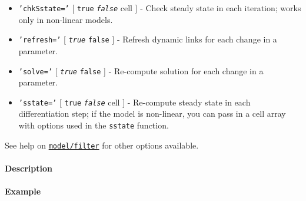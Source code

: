 \begin{itemize}
\item
  \texttt{'chkSstate='} {[} \texttt{true} \textbar{}
  \emph{\texttt{false}} \textbar{} cell {]} - Check steady state in each
  iteration; works only in non-linear models.
\item
  \texttt{'refresh='} {[} \emph{\texttt{true}} \textbar{} \texttt{false}
  {]} - Refresh dynamic links for each change in a parameter.
\item
  \texttt{'solve='} {[} \emph{\texttt{true}} \textbar{} \texttt{false}
  {]} - Re-compute solution for each change in a parameter.
\item
  \texttt{'sstate='} {[} \texttt{true} \textbar{} \emph{\texttt{false}}
  \textbar{} cell {]} - Re-compute steady state in each differentiation
  step; if the model is non-linear, you can pass in a cell array with
  options used in the \texttt{sstate} function.
\end{itemize}

See help on \href{model/filter}{\texttt{model/filter}} for other options
available.

\paragraph{Description}

\paragraph{Example}


